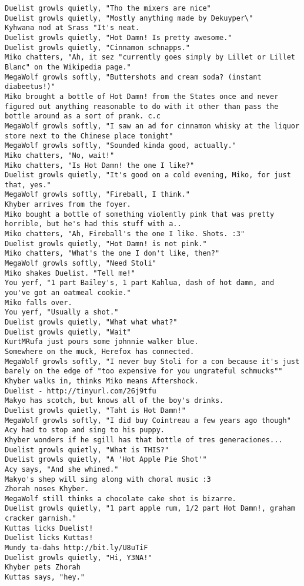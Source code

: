 \begin{verbatim}
Duelist growls quietly, "Tho the mixers are nice"
Duelist growls quietly, "Mostly anything made by Dekuyper\"
Kyhwana nod at Srass "It's neat.
Duelist growls quietly, "Hot Damn! Is pretty awesome."
Duelist growls quietly, "Cinnamon schnapps."
Miko chatters, "Ah, it sez "currently goes simply by Lillet or Lillet Blanc" on the Wikipedia page."
MegaWolf growls softly, "Buttershots and cream soda? (instant diabeetus!)"
Miko brought a bottle of Hot Damn! from the States once and never figured out anything reasonable to do with it other than pass the bottle around as a sort of prank. c.c
MegaWolf growls softly, "I saw an ad for cinnamon whisky at the liquor store next to the Chinese place tonight"
MegaWolf growls softly, "Sounded kinda good, actually."
Miko chatters, "No, wait!"
Miko chatters, "Is Hot Damn! the one I like?"
Duelist growls quietly, "It's good on a cold evening, Miko, for just that, yes."
MegaWolf growls softly, "Fireball, I think."
Khyber arrives from the foyer.
Miko bought a bottle of something violently pink that was pretty horrible, but he's had this stuff with a..
Miko chatters, "Ah, Fireball's the one I like. Shots. :3"
Duelist growls quietly, "Hot Damn! is not pink."
Miko chatters, "What's the one I don't like, then?"
MegaWolf growls softly, "Need Stoli"
Miko shakes Duelist. "Tell me!"
You yerf, "1 part Bailey's, 1 part Kahlua, dash of hot damn, and you've got an oatmeal cookie."
Miko falls over.
You yerf, "Usually a shot."
Duelist growls quietly, "What what what?"
Duelist growls quietly, "Wait"
KurtMRufa just pours some johnnie walker blue.
Somewhere on the muck, Herefox has connected.
MegaWolf growls softly, "I never buy Stoli for a con because it's just barely on the edge of "too expensive for you ungrateful schmucks""
Khyber walks in, thinks Miko means Aftershock.
Duelist - http://tinyurl.com/26j9tfu
Makyo has scotch, but knows all of the boy's drinks.
Duelist growls quietly, "Taht is Hot Damn!"
MegaWolf growls softly, "I did buy Cointreau a few years ago though"
Acy had to stop and sing to his puppy.
Khyber wonders if he sgill has that bottle of tres generaciones...
Duelist growls quietly, "What is THIS?"
Duelist growls quietly, "A 'Hot Apple Pie Shot'"
Acy says, "And she whined."
Makyo's shep will sing along with choral music :3
Zhorah noses Khyber.
MegaWolf still thinks a chocolate cake shot is bizarre.
Duelist growls quietly, "1 part apple rum, 1/2 part Hot Damn!, graham cracker garnish."
Kuttas licks Duelist!
Duelist licks Kuttas!
Mundy ta-dahs http://bit.ly/U8uTiF
Duelist growls quietly, "Hi, Y3NA!"
Khyber pets Zhorah
Kuttas says, "hey."

\end{verbatim}
